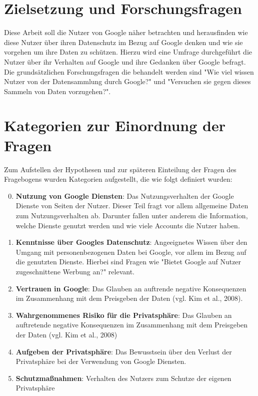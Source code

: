 \section{Zielsetzung und Forschungsfragen}
Diese Arbeit soll die Nutzer von Google näher betrachten und herausfinden wie diese Nutzer über ihren Datenschutz im Bezug auf Google denken und wie sie vorgehen um ihre Daten zu schützen. Hierzu wird eine Umfrage durchgeführt die Nutzer über ihr Verhalten auf Google und ihre Gedanken über Google befragt.
Die grundsätzlichen Forschungsfragen die behandelt werden sind "Wie viel wissen Nutzer von der Datensammlung durch Google?" und "Versuchen sie gegen dieses Sammeln von Daten vorzugehen?". 

\section{Kategorien zur Einordnung der Fragen}
\label{sec:categories}
Zum Aufstellen der Hypothesen und zur späteren Einteilung der Fragen des Fragebogens wurden Kategorien aufgestellt, die wie folgt definiert wurden:
\begin{enumerate}
\setcounter{enumi}{-1}
\item \label{itm:Kat0}\textbf{Nutzung von Google Diensten}: Das Nutzungsverhalten der Google Dienste von Seiten der Nutzer. Dieser Teil fragt vor allem allgemeine Daten zum Nutzungsverhalten ab. Darunter fallen unter anderem die Information, welche Dienste genutzt werden und wie viele Accounts die Nutzer haben.
\item \label{itm:Kat1}\textbf{Kenntnisse über Googles Datenschutz}: Angeeignetes Wissen über den Umgang mit personenbezogenen Daten bei Google, vor allem im Bezug auf die genutzten Dienste. Hierbei sind Fragen wie "Bietet Google auf Nutzer zugeschnittene Werbung an?" relevant.
\item \label{itm:Kat2}\textbf{Vertrauen in Google}: Das Glauben an auftrende negative Konsequenzen im Zusammenhang mit dem Preisgeben der Daten (vgl. Kim et al., 2008).
\item \label{itm:Kat3}\textbf{Wahrgenommenes Risiko für die Privatsphäre}: Das Glauben an auftretende negative Konsequenzen im Zusammenhang mit dem Preisgeben der Daten (vgl. Kim et al., 2008)
\item \label{itm:Kat4}\textbf{Aufgeben der Privatsphäre}: Das Bewusstsein über den Verlust der Privatsphäre bei der Verwendung von Google Diensten.
\item \label{itm:Kat5}\textbf{Schutzmaßnahmen}: Verhalten des Nutzers zum Schutze der eigenen Privatsphäre
\end{enumerate}

